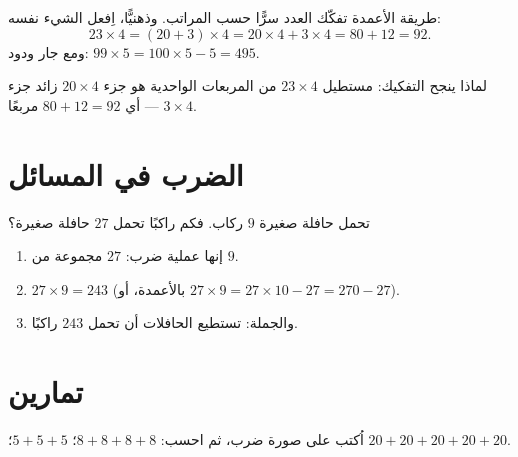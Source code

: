 \begin{example}\label{ex:g3:mult:split}
طريقة الأعمدة تفكّك العدد سرًّا حسب المراتب. وذهنيًّا، اِفعل
الشيء نفسه:
\[
23 \times 4 = (20 + 3) \times 4 = 20 \times 4 + 3 \times 4
= 80 + 12 = 92 .
\]
ومع جار ودود: $99 \times 5 = 100 \times 5 - 5 =
495$.
\end{example}

\begin{omfigure}

{\small لماذا ينجح التفكيك: مستطيل $23 \times 4$ من المربعات
الواحدية هو جزء $20 \times 4$ زائد جزء $3 \times 4$ ---
أي $80 + 12 = 92$ مربعًا.}
\end{omfigure}

\section{الضرب في المسائل}

\begin{example}\label{ex:g3:mult:problem}
تحمل حافلة صغيرة $9$ ركاب. فكم راكبًا تحمل $27$
حافلة صغيرة؟
\begin{enumerate}
  \item إنها عملية ضرب: $27$ مجموعة من $9$.
  \item $27 \times 9 = 243$ (بالأعمدة، أو
        $27 \times 9 = 27 \times 10 - 27 = 270 - 27$).
  \item والجملة: تستطيع الحافلات أن تحمل $243$ راكبًا.
\end{enumerate}
\end{example}

\section{تمارين}

\begin{exercise}[$\star$]\label{exo:g3:mult:1}
اُكتب على صورة ضرب، ثم احسب:
$8 + 8 + 8 + 8$؛ \quad $5 + 5 + 5$؛ \quad
$20 + 20 + 20 + 20 + 20$.
\end{exercise}

